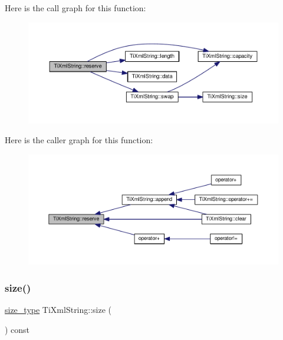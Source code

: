 Here is the call graph for this function\+:
\nopagebreak
\begin{figure}[H]
\begin{center}
\leavevmode
\includegraphics[width=350pt]{class_ti_xml_string_a88ecf9f0f00cb5c67b6b637958d7049c_cgraph}
\end{center}
\end{figure}
Here is the caller graph for this function\+:
\nopagebreak
\begin{figure}[H]
\begin{center}
\leavevmode
\includegraphics[width=350pt]{class_ti_xml_string_a88ecf9f0f00cb5c67b6b637958d7049c_icgraph}
\end{center}
\end{figure}
\mbox{\label{class_ti_xml_string_a483d85103d2a3ba8c0831e205c832f33}} 
\subsubsection{\texorpdfstring{size()}{size()}}
{\footnotesize\ttfamily \hyperlink{class_ti_xml_string_abeb2c1893a04c17904f7c06546d0b971}{size\+\_\+type} Ti\+Xml\+String\+::size (\begin{DoxyParamCaption}{ }\end{DoxyParamCaption}) const\hspace{0.3cm}{\ttfamily [inline]}}

